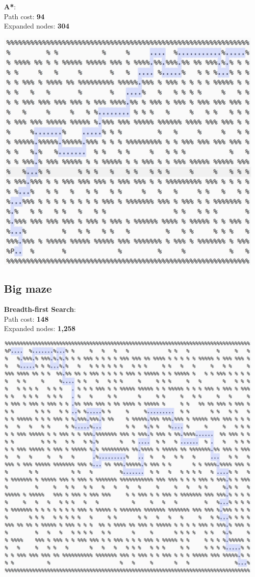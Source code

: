 \documentclass[11pt]{article}
\begin{document}
\textbf{A*}:\\
Path cost: \textbf{94}\\
Expanded nodes: \textbf{304}
\begin{center}
\includegraphics[scale=0.8]{medium-maze/a-star.png}
\end{center}
\pagebreak

\subsection*{Big maze}
\textbf{Breadth-first Search}:\\
Path cost: \textbf{148}\\
Expanded nodes: \textbf{1,258}
\begin{center}
\includegraphics[scale=0.6]{big-maze/bfs.png}
\end{center}
\pagebreak
\end{document}
